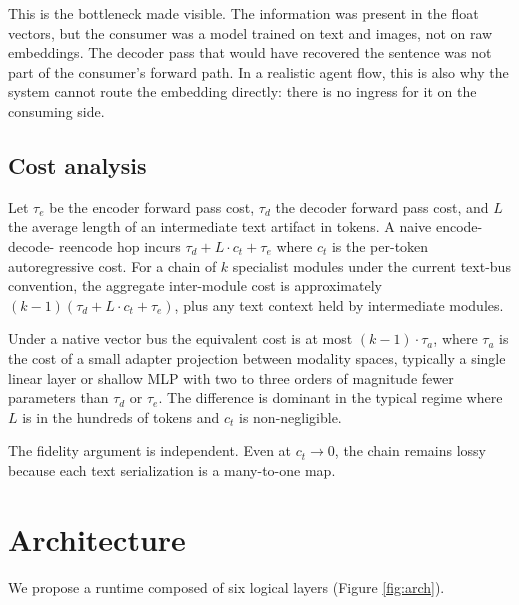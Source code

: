\documentclass[11pt]{article}
\begin{document}
This is the bottleneck made visible. The information was present
in the float vectors, but the consumer was a model trained on
text and images, not on raw embeddings. The decoder pass that
would have recovered the sentence was not part of the consumer's
forward path. In a realistic agent flow, this is also why the
system cannot route the embedding directly: there is no
ingress for it on the consuming side.

\subsection{Cost analysis}

Let $\tau_e$ be the encoder forward pass cost, $\tau_d$ the
decoder forward pass cost, and $L$ the average length of an
intermediate text artifact in tokens. A naive encode-decode-
reencode hop incurs $\tau_d + L \cdot c_t + \tau_e$ where
$c_t$ is the per-token autoregressive cost. For a chain of
$k$ specialist modules under the current text-bus convention,
the aggregate inter-module cost is approximately
$(k-1)(\tau_d + L \cdot c_t + \tau_e)$, plus any text
context held by intermediate modules.

Under a native vector bus the equivalent cost is at most
$(k-1) \cdot \tau_a$, where $\tau_a$ is the cost of a small
adapter projection between modality spaces, typically a
single linear layer or shallow MLP with two to three orders of
magnitude fewer parameters than $\tau_d$ or $\tau_e$. The
difference is dominant in the typical regime where $L$ is
in the hundreds of tokens and $c_t$ is non-negligible.

The fidelity argument is independent. Even at $c_t \to 0$,
the chain remains lossy because each text serialization is a
many-to-one map.

\section{Architecture}
\label{sec:architecture}

We propose a runtime composed of six logical layers (Figure
\ref{fig:arch}).
\end{document}
